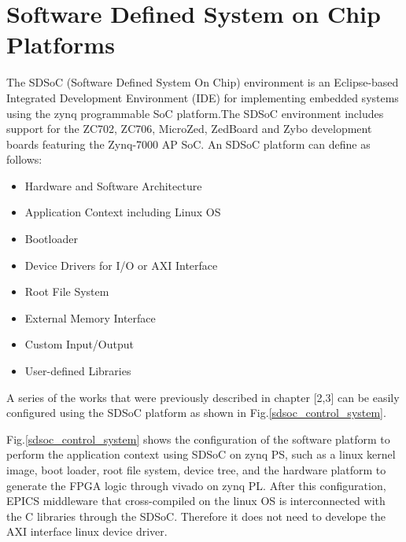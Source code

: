 \documentclass[journal,reqno]{IEEEtran}
\begin{document}
\section{Software Defined System on Chip Platforms}
The SDSoC (Software Defined System On Chip)\cite{sdsoc} environment is an Eclipse-based Integrated Development Environment (IDE) for implementing embedded systems using the zynq programmable SoC platform.The SDSoC environment includes support for the ZC702, ZC706, MicroZed, ZedBoard and Zybo development boards featuring the Zynq-7000 AP SoC.
\hfil\break\hfil\break
An SDSoC platform can define as follows:
\begin{itemize}
 	\item Hardware and Software Architecture
 	\item Application Context including Linux OS
 	\item Bootloader
 	\item Device Drivers for I/O or AXI Interface
 	\item Root File System
	\item External Memory Interface
	\item Custom Input/Output
	\item User-defined Libraries
\end{itemize}
A series of the works that were previously described in chapter [2,3] can be easily configured using the SDSoC platform as shown in Fig.\ref{sdsoc_control_system}. 

Fig.\ref{sdsoc_control_system} shows the configuration of the software platform to perform the application context using SDSoC on zynq PS, such as a linux kernel image, boot loader, root file system, device tree, and  the hardware platform to generate the FPGA logic through vivado on zynq PL. After this configuration, EPICS middleware that cross-compiled on the linux OS is interconnected with the C libraries through the SDSoC. Therefore it does not need to develope the AXI interface linux device driver.
\end{document}
